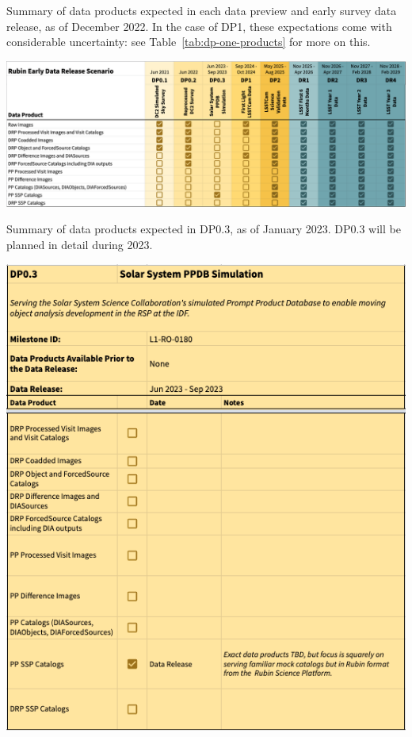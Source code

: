 \begin{table}
\caption{Summary of data products expected in each data preview and early survey data release, as of December 2022.
In the case of DP1, these expectations come with considerable uncertainty: see Table~\ref{tab:dp-one-products} for more on this.}
\label{tab:summary}
\includegraphics[width=\linewidth]{figures/DPR-summary}
\end{table}

\begin{table}
\caption{Summary of data products expected in DP0.3, as of January 2023.
DP0.3 will be planned in detail during 2023.}
\label{tab:dp-zpthree-products}
\includegraphics[width=\linewidth]{figures/DP0_3-products}
\end{table}


